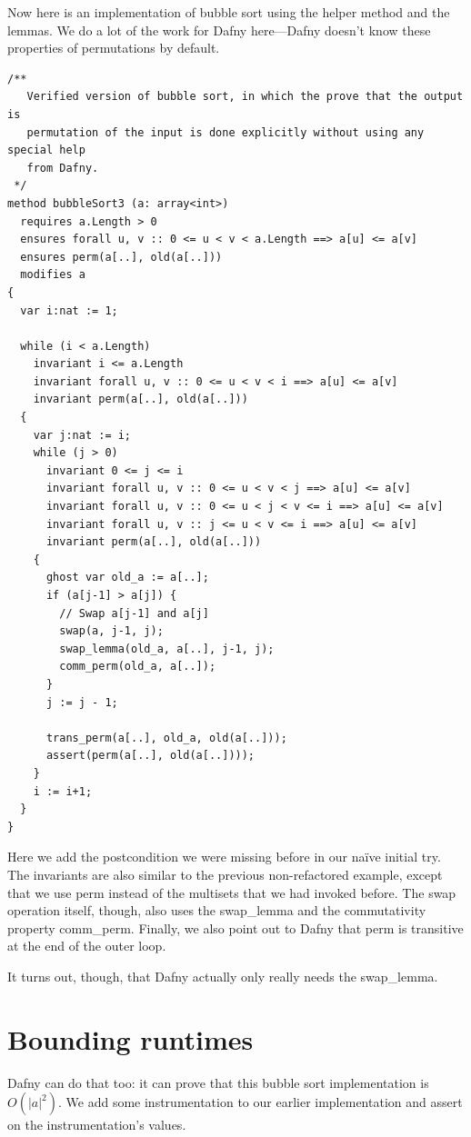 \documentclass[11pt]{article}
\begin{document}
Now here is an implementation of bubble sort using the helper method and the lemmas.
We do a lot of the work for Dafny here---Dafny doesn't know these properties of permutations
by default.
\begin{lstlisting}[language=dafny]
/**
   Verified version of bubble sort, in which the prove that the output is
   permutation of the input is done explicitly without using any special help
   from Dafny.
 */
method bubbleSort3 (a: array<int>)
  requires a.Length > 0
  ensures forall u, v :: 0 <= u < v < a.Length ==> a[u] <= a[v]
  ensures perm(a[..], old(a[..]))
  modifies a
{
  var i:nat := 1;

  while (i < a.Length)
    invariant i <= a.Length
    invariant forall u, v :: 0 <= u < v < i ==> a[u] <= a[v]
    invariant perm(a[..], old(a[..]))
  {
    var j:nat := i;
    while (j > 0)
      invariant 0 <= j <= i
      invariant forall u, v :: 0 <= u < v < j ==> a[u] <= a[v]
      invariant forall u, v :: 0 <= u < j < v <= i ==> a[u] <= a[v]
      invariant forall u, v :: j <= u < v <= i ==> a[u] <= a[v]
      invariant perm(a[..], old(a[..]))
    {
      ghost var old_a := a[..];
      if (a[j-1] > a[j]) {
        // Swap a[j-1] and a[j]
        swap(a, j-1, j);
        swap_lemma(old_a, a[..], j-1, j);
        comm_perm(old_a, a[..]);
      }
      j := j - 1;

      trans_perm(a[..], old_a, old(a[..]));
      assert(perm(a[..], old(a[..])));
    }
    i := i+1;
  }
}
\end{lstlisting}
Here we add the postcondition we were missing before in our na\"ive
initial try. The invariants are also similar to the previous
non-refactored example, except that we use \textsf{perm} instead of
the multisets that we had invoked before. The swap operation itself, though,
also uses the \textsf{swap\_lemma} and the commutativity property
\textsf{comm\_perm}. Finally, we also point out to Dafny that \textsf{perm} is
transitive at the end of the outer loop.

It turns out, though, that Dafny actually only really needs the
\textsf{swap\_lemma}.

\section*{Bounding runtimes}
Dafny can do that too: it can prove that this bubble sort implementation is
$O(|a|^2)$. We add some instrumentation to our earlier implementation and assert
on the instrumentation's values.
\end{document}
